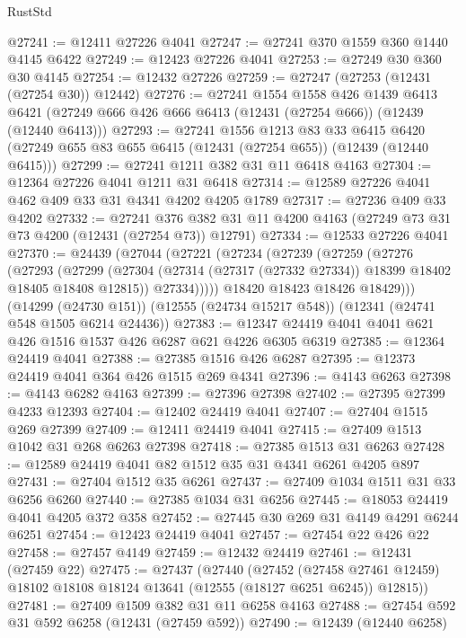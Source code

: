 \begin{lexlean}{RustStd}
\begin{coremodule}
@27241 := @12411 @27226 @4041
@27247 := @27241 @370 @1559 @360 @1440 @4145 @6422
@27249 := @12423 @27226 @4041
@27253 := @27249 @30 @360 @30 @4145
@27254 := @12432 @27226
@27259 := @27247 (@27253 (@12431 (@27254 @30)) @12442)
@27276 := @27241
    @1554
    @1558
    @426
    @1439
    @6413
    @6421
    (@27249 @666 @426 @666 @6413 (@12431 (@27254 @666)) (@12439 (@12440 @6413)))
@27293 := @27241
    @1556
    @1213
    @83
    @33
    @6415
    @6420
    (@27249 @655 @83 @655 @6415 (@12431 (@27254 @655)) (@12439 (@12440 @6415)))
@27299 := @27241 @1211 @382 @31 @11 @6418 @4163
@27304 := @12364 @27226 @4041 @1211 @31 @6418
@27314 := @12589 @27226 @4041 @462 @409 @33 @31 @4341 @4202 @4205 @1789
@27317 := @27236 @409 @33 @4202
@27332 := @27241
    @376
    @382
    @31
    @11
    @4200
    @4163
    (@27249 @73 @31 @73 @4200 (@12431 (@27254 @73)) @12791)
@27334 := @12533 @27226 @4041
@27370 := @24439
    (@27044
      (@27221
        (@27234
          (@27239
            (@27259
              (@27276
                (@27293
                  (@27299
                    (@27304 (@27314 (@27317 (@27332 @27334)) @18399 @18402 @18405 @18408 @12815))
                    @27334)))))
          @18420
          @18423
          @18426
          @18429)))
    (@14299 (@24730 @151))
    (@12555 (@24734 @15217 @548))
    (@12341 (@24741 @548 @1505 @6214 @24436))
@27383 := @12347 @24419 @4041 @4041 @621 @426 @1516 @1537 @426 @6287 @621 @4226 @6305 @6319
@27385 := @12364 @24419 @4041
@27388 := @27385 @1516 @426 @6287
@27395 := @12373 @24419 @4041 @364 @426 @1515 @269 @4341
@27396 := @4143 @6263
@27398 := @4143 @6282 @4163
@27399 := @27396 @27398
@27402 := @27395 @27399 @4233 @12393
@27404 := @12402 @24419 @4041
@27407 := @27404 @1515 @269 @27399
@27409 := @12411 @24419 @4041
@27415 := @27409 @1513 @1042 @31 @268 @6263 @27398
@27418 := @27385 @1513 @31 @6263
@27428 := @12589 @24419 @4041 @82 @1512 @35 @31 @4341 @6261 @4205 @897
@27431 := @27404 @1512 @35 @6261
@27437 := @27409 @1034 @1511 @31 @33 @6256 @6260
@27440 := @27385 @1034 @31 @6256
@27445 := @18053 @24419 @4041 @4205 @372 @358
@27452 := @27445 @30 @269 @31 @4149 @4291 @6244 @6251
@27454 := @12423 @24419 @4041
@27457 := @27454 @22 @426 @22
@27458 := @27457 @4149
@27459 := @12432 @24419
@27461 := @12431 (@27459 @22)
@27475 := @27437
    (@27440
      (@27452
        (@27458 @27461 @12459)
        @18102
        @18108
        @18124
        @13641
        (@12555 (@18127 @6251 @6245))
        @12815))
@27481 := @27409 @1509 @382 @31 @11 @6258 @4163
@27488 := @27454 @592 @31 @592 @6258 (@12431 (@27459 @592))
@27490 := @12439 (@12440 @6258)

\end{coremodule}
\end{lexlean}
